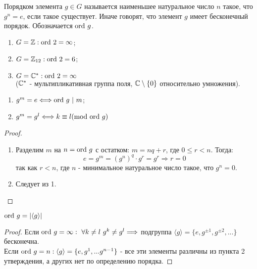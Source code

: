 \begin{definition}
    Порядком элемента $g \in G$ называется наименьшее натуральное число $n$ такое, что $g^n = e$, если такое существует. Иначе говорят, что элемент $g$ имеет бесконечный порядок. Обозначается $\textup{ord} \ g$.
\end{definition}
\begin{examples} \tab
    \begin{enumerate}
        \item $G = \mathbb{Z}: \textup{ord } 2 = \infty$;
        \item $G = \mathbb{Z}_{12}: \textup{ord } 2 = 6$;
        \item $G = \mathbb{C}^*: \textup{ord } 2 = \infty$\\
        ($\mathbb{C}^*$ - мультипликативная группа поля, $\mathbb{C}\setminus\{0\}$ относительно умножения).
    \end{enumerate}
\end{examples}
\begin{subtheoremnum}\tab
    \begin{enumerate}
        \item $g^m = e \Longleftrightarrow \textup{ord } g \ | \ m$;
        \item $g^m = g^l \Longleftrightarrow k \equiv l (\textup{mod ord } g)$
    \end{enumerate}
\end{subtheoremnum}
\begin{proof} \tab
    \begin{enumerate}
        \item Разделим $m$ на $n = \textup{ord } g$ с остатком: $m = nq + r$, где $0 \leqslant r < n$. Тогда:
        $$e = g^m = (g^n)^q \cdot g^r = g^r \Longrightarrow r = 0$$
        так как $r < n$, где $n$ - минимальное натуральное число такое, что $g^n = 0$.
        \item Следует из 1. 
    \end{enumerate}
\end{proof}
\begin{consequense}
    $\textup{ord } g = |\langle g \rangle|$
\end{consequense}
\begin{proof}
    Если $\textup{ord } g = \infty: \ \forall k \neq l \ g^k \neq g^l \Longrightarrow$ подгруппа $\langle g \rangle = \{e, g^{\pm 1}, g^{\pm 2},...\}$ бесконечна.\\
    Если $\textup{ord } g = n: \langle g \rangle = \{e, g^1, ... g^{n-1}\}$ - все эти элементы различны из пункта 2 утверждения, а других нет по определению порядка.
\end{proof}
